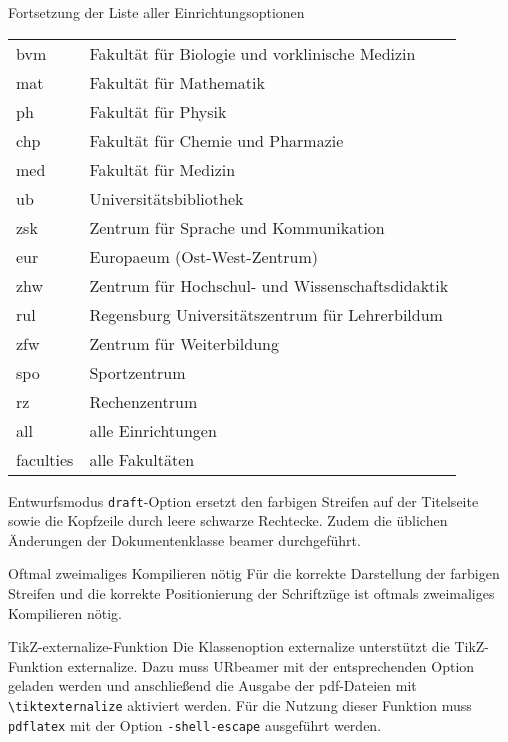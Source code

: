 \documentclass[aspectratio=169,ngerman,ph]{URbeamer} %
\begin{document}
\begin{frame}{Fortsetzung der Liste aller Einrichtungsoptionen}
\begin{tabularx}{\linewidth}{lX}
bvm&Fakultät für Biologie und vorklinische Medizin\\
mat&Fakultät für Mathematik\\
ph&Fakultät für Physik\\
chp&Fakultät für Chemie und Pharmazie\\
med&Fakultät für Medizin\\
ub&Universitätsbibliothek\\
zsk&Zentrum für Sprache und Kommunikation\\
eur&Europaeum (Ost-West-Zentrum)\\
zhw&Zentrum für Hochschul- und Wissenschaftsdidaktik\\
rul&Regensburg Universitätszentrum für Lehrerbildum\\
zfw&Zentrum für Weiterbildung\\
spo&Sportzentrum \\
rz&Rechenzentrum\\
all&alle Einrichtungen\\
faculties&alle Fakultäten\\
\end{tabularx}
\end{frame}
\begin{frame}{Entwurfsmodus}
\texttt{draft}-Option ersetzt den farbigen Streifen auf der Titelseite sowie die Kopfzeile durch leere schwarze Rechtecke.
Zudem die üblichen Änderungen der Dokumentenklasse beamer durchgeführt.
\end{frame}
\begin{frame}{Oftmal zweimaliges Kompilieren nötig}
Für die korrekte Darstellung der farbigen Streifen und die korrekte Positionierung der Schriftzüge ist oftmals zweimaliges Kompilieren nötig.
\end{frame}

\begin{frame}{TikZ-externalize-Funktion}
	Die Klassenoption externalize unterstützt die TikZ-Funktion \glqq{}externalize\grqq. Dazu muss URbeamer mit der entsprechenden Option geladen werden und anschließend die Ausgabe der pdf-Dateien mit \texttt{\textbackslash{}tiktexternalize} aktiviert werden. Für die Nutzung dieser Funktion muss \texttt{pdflatex} mit  der Option \texttt{-shell-escape} ausgeführt werden.
	
\end{frame}
\end{document}

